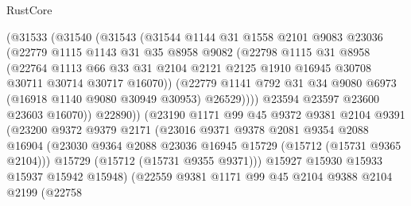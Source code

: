 \begin{lexlean}{RustCore}
\begin{coremodule}
                (@31533
                  (@31540
                    (@31543
                      (@31544
                        @1144
                        @31
                        @1558
                        @2101
                        @9083
                        @23036
                        (@22779
                          @1115
                          @1143
                          @31
                          @35
                          @8958
                          @9082
                          (@22798
                            @1115
                            @31
                            @8958
                            (@22764
                              @1113
                              @66
                              @33
                              @31
                              @2104
                              @2121
                              @2125
                              @1910
                              @16945
                              @30708
                              @30711
                              @30714
                              @30717
                              @16070))
                          (@22779
                            @1141
                            @792
                            @31
                            @34
                            @9080
                            @6973
                            (@16918 @1140 @9080 @30949 @30953)
                            @26529))))
                    @23594
                    @23597
                    @23600
                    @23603
                    @16070))
                @22890))
            (@23190
              @1171
              @99
              @45
              @9372
              @9381
              @2104
              @9391
              (@23200
                @9372
                @9379
                @2171
                (@23016
                  @9371
                  @9378
                  @2081
                  @9354
                  @2088
                  @16904
                  (@23030 @9364 @2088 @23036 @16945 @15729 (@15712 (@15731 @9365 @2104)))
                  @15729
                  (@15712 (@15731 @9355 @9371)))
                @15927
                @15930
                @15933
                @15937
                @15942
                @15948)
              (@22559
                @9381
                @1171
                @99
                @45
                @2104
                @9388
                @2104
                @2199
                (@22758

\end{coremodule}
\end{lexlean}
